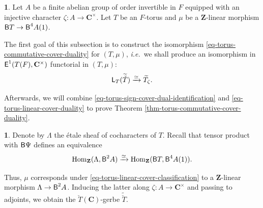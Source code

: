 \documentclass[10pt,english,reqno]{amsart}
\newcommand{\integers}{\mathbf Z}
\newcommand{\complexes}{\mathbf C}
\newcommand{\extension}{\textnormal{\textsf{E}}}
\newcommand{\Hom}{\operatorname{Hom}}
\newcommand{\deloop}{\textnormal{\textsf{B}}}
\newcommand{\Langlands}{\textnormal{\textsf{L}}}
\theoremstyle{definition}
\numberwithin{equation}{section}
\newtheorem{untitledsubsubsection}[subsubsection]{}
\newenvironment{void}
{\begin{untitledsubsubsection}}
{\end{untitledsubsubsection}}
\begin{document}
\begin{void}
Let $A$ be a finite abelian group of order invertible in $F$ equipped with an injective character $\zeta : A \rightarrow \complexes^{\times}$. Let $T$ be an $F$-torus and $\mu$ be a $\integers$-linear morphism $\deloop T \rightarrow \deloop^4A(1)$.

The first goal of this subsection is to construct the isomorphism \eqref{eq-torus-commutative-cover-duality} for $(T, \mu)$, \emph{i.e.}~we shall produce an isomorphism in $\extension^1(T(F), \complexes^{\times})$ functorial in $(T, \mu)$:
\begin{equation}
\label{eq-torus-linear-cover-duality}
	\Langlands_T(\widetilde{\check T}) \xrightarrow{\simeq} \widetilde T_{\zeta}.
\end{equation}

Afterwards, we will combine \eqref{eq-torus-sign-cover-dual-identification} and \eqref{eq-torus-linear-cover-duality} to prove Theorem \ref{thm-torus-commutative-cover-duality}.
\end{void}


\begin{void}
Denote by $\Lambda$ the \'etale sheaf of cocharacters of $T$. Recall that tensor product with $\deloop\Psi$ defines an equivalence
\begin{equation}
\label{eq-torus-linear-cover-classification}
\Hom_{\integers}(\Lambda, \deloop^2 A) \xrightarrow{\simeq} \Hom_{\integers}(\deloop T, \deloop^4A(1)).
\end{equation}

Thus, $\mu$ corresponds under \eqref{eq-torus-linear-cover-classification} to a $\integers$-linear morphism $\Lambda \rightarrow \deloop^2 A$. Inducing the latter along $\zeta : A \rightarrow \complexes^{\times}$ and passing to adjoints, we obtain the $\check T(\complexes)$-gerbe $\widetilde{\check T}$.
\end{void}

\end{document}
